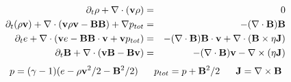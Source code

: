 \begin{eqnarray*}
    \partial_t \rho+\nabla\cdot({\bf v}\rho)&=& 0
\\
    \partial_t(\rho{\bf v})+\nabla\cdot({\bf v}\rho{\bf v}-{\bf B}{\bf B})+\nabla p_{tot}&=& 
       -(\nabla\cdot{\bf B}){\bf B}
\\
    \partial_t e+\nabla\cdot({\bf v} e-{\bf B}{\bf B}\cdot{\bf v}+{\bf v} p_{tot})&=& 
       -(\nabla\cdot{\bf B}){\bf B}\cdot{\bf v}+\nabla\cdot({\bf B}\times\eta{\bf J})
\\
   \partial_t {\bf B}+\nabla\cdot({\bf v}{\bf B}-{\bf B}{\bf v})&=&
       -(\nabla\cdot{\bf B}){\bf v}-\nabla\times(\eta{\bf J}) 
\end{eqnarray*}
\null
\begin{displaymath}
p=(\gamma-1)(e-\rho{\bf v}^2/2-{\bf B}^2/2)~~~~~p_{tot}=p+{\bf B}^2/2~~~~~{\bf J}=\nabla\times{\bf B}
\end{displaymath}
